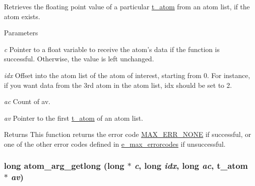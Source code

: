 Retrieves the floating point value of a particular \hyperlink{structt__atom}{t\_\-atom} from an atom list, if the atom exists. 
\begin{DoxyParams}{Parameters}
\item[{\em c}]Pointer to a float variable to receive the atom's data if the function is successful. Otherwise, the value is left unchanged. \item[{\em idx}]Offset into the atom list of the atom of interest, starting from 0. For instance, if you want data from the 3rd atom in the atom list, {\ttfamily idx} should be set to 2. \item[{\em ac}]Count of av. \item[{\em av}]Pointer to the first \hyperlink{structt__atom}{t\_\-atom} of an atom list.\end{DoxyParams}
\begin{DoxyReturn}{Returns}
This function returns the error code \hyperlink{group__misc_gga0764dd6c02b76cca7d053ae50555d69da6d22f77fef8b1e1b074cef5d29d935fd}{MAX\_\-ERR\_\-NONE} if successful, or one of the other error codes defined in \hyperlink{group__misc_ga0764dd6c02b76cca7d053ae50555d69d}{e\_\-max\_\-errorcodes} if unsuccessful. 
\end{DoxyReturn}
\hypertarget{group__atom_gaba53e6f86741dea07cff414b9b5d6a8b}{
\subsubsection[{atom\_\-arg\_\-getlong}]{\setlength{\rightskip}{0pt plus 5cm}long atom\_\-arg\_\-getlong (long $\ast$ {\em c}, \/  long {\em idx}, \/  long {\em ac}, \/  {\bf t\_\-atom} $\ast$ {\em av})}}
\label{group__atom_gaba53e6f86741dea07cff414b9b5d6a8b}


